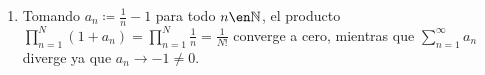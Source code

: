 \begin{sol}
\begin{enumerate}[label=(\alph*), leftmargin=1.5em]
Por otro lado, como $\frac{1}{\sqrt{n}} \to0$ de forma monótona, el criterio de Leibniz garantiza que $\sum^\infty_{n=2}\frac{(-1)^n}{\sqrt{n}}$ converge, así que por linealidad también converge $\sum^\infty_{n=2}a_n = i\sum^\infty_{n=2}\frac{(-1)^n}{\sqrt{n}}$.
\item 
Tomando $a_n \coloneq \frac{1}{n} - 1$ para todo $n\en\mathbb{N}$, el producto $\prod^N_{n=1}(1+a_n) = \prod^N_{n=1}\frac{1}{n} = \frac{1}{N!}$ converge a cero, mientras que $\sum^\infty_{n=1}a_n$ diverge ya que $a_n \to -1\neq0$.
\end{enumerate}
\end{sol}

